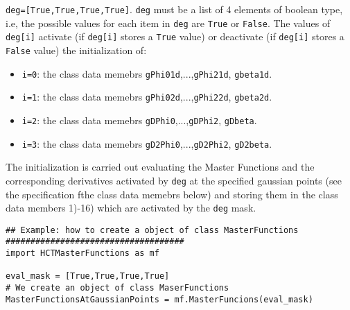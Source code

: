\documentclass{amsart}
\theoremstyle{plain}
\theoremstyle{definition}
\theoremstyle{remark}
\numberwithin{equation}{section}
\begin{document}
\verb|deg=[True,True,True,True]|. \verb|deg| must be a list of 4 elements of boolean type, i.e, the possible values for each item in \verb|deg| are \verb|True| or \verb|False|. The values of \verb|deg[i]| activate (if \verb|deg[i]| stores a \verb|True| value) or deactivate (if \verb|deg[i]| stores a \verb|False| value) the initialization of:
\begin{itemize}
\item \verb|i=0|: the class data memebrs \verb|gPhi01d|,...,\verb|gPhi21d|, \verb|gbeta1d|.
\item \verb|i=1|: the class data memebrs \verb|gPhi02d|,...,\verb|gPhi22d|, \verb|gbeta2d|.
\item \verb|i=2|: the class data memebrs \verb|gDPhi0|,...,\verb|gDPhi2|, \verb|gDbeta|.
\item \verb|i=3|: the class data memebrs \verb|gD2Phi0|,...,\verb|gD2Phi2|, \verb|gD2beta|.
\end{itemize}
The initialization is carried out evaluating the Master Functions and the corresponding derivatives activated by \verb|deg| at the specified gaussian points (see the specification fthe class data memebrs below) and storing them in the class data members 1)-16) which are activated by the \verb|deg| mask.

\begin{lstlisting} 
## Example: how to create a object of class MasterFunctions
####################################
import HCTMasterFunctions as mf

eval_mask = [True,True,True,True]
# We create an object of class MaserFunctions
MasterFunctionsAtGaussianPoints = mf.MasterFuncions(eval_mask)
\end{lstlisting}
\end{document}
